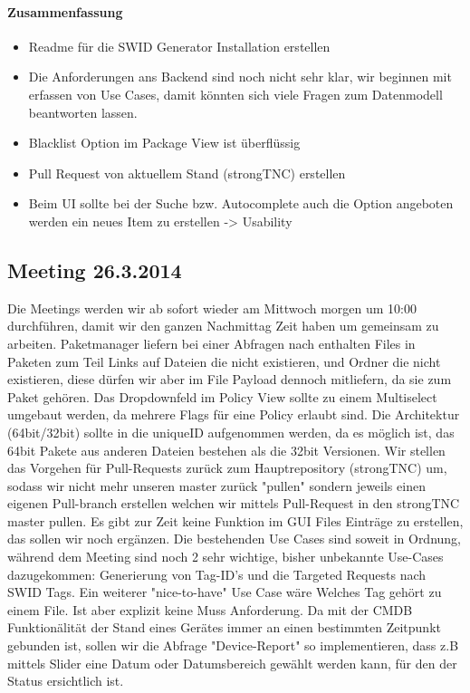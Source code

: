 \paragraph{Zusammenfassung}
\begin{itemize}
\item Readme für die SWID Generator Installation erstellen
\item Die Anforderungen ans Backend sind noch nicht sehr klar, wir beginnen mit erfassen von Use Cases, damit könnten sich viele Fragen zum Datenmodell beantworten lassen.
\item Blacklist Option im Package View ist überflüssig
\item Pull Request von aktuellem Stand (strongTNC) erstellen
\item Beim UI sollte bei der Suche bzw. Autocomplete auch die Option angeboten werden ein neues Item zu erstellen -> Usability
\end{itemize}

\subsection{Meeting 26.3.2014}
Die Meetings werden wir ab sofort wieder am Mittwoch morgen um 10:00 durchführen, damit wir den ganzen Nachmittag Zeit haben um gemeinsam zu arbeiten. Paketmanager liefern bei einer Abfragen nach enthalten Files in Paketen zum Teil Links auf Dateien die nicht existieren, und Ordner die nicht existieren, diese dürfen wir aber im File Payload dennoch mitliefern, da sie zum Paket gehören. Das Dropdownfeld im Policy View sollte zu einem Multiselect umgebaut werden, da mehrere Flags für eine Policy erlaubt sind. Die Architektur (64bit/32bit) sollte in die uniqueID aufgenommen werden, da es möglich ist, das 64bit Pakete aus anderen Dateien bestehen als die 32bit Versionen. Wir stellen das Vorgehen für Pull-Requests zurück zum Hauptrepository (strongTNC) um, sodass wir nicht mehr unseren master zurück "pullen" sondern jeweils einen eigenen Pull-branch erstellen welchen wir mittels Pull-Request in den strongTNC master pullen. Es gibt zur Zeit keine Funktion im GUI Files Einträge zu erstellen, das sollen wir noch ergänzen. Die bestehenden Use Cases sind soweit in Ordnung, während dem Meeting sind noch 2 sehr wichtige, bisher unbekannte Use-Cases dazugekommen: Generierung von Tag-ID's und die Targeted Requests nach SWID Tags.
Ein weiterer "nice-to-have" Use Case wäre Welches Tag gehört zu einem File. Ist aber explizit keine Muss Anforderung.
Da mit der CMDB Funktionälität der Stand eines Gerätes immer an einen bestimmten Zeitpunkt gebunden ist, sollen wir die Abfrage "Device-Report" so implementieren, dass z.B mittels Slider eine Datum oder Datumsbereich gewählt werden kann, für den der Status ersichtlich ist.


